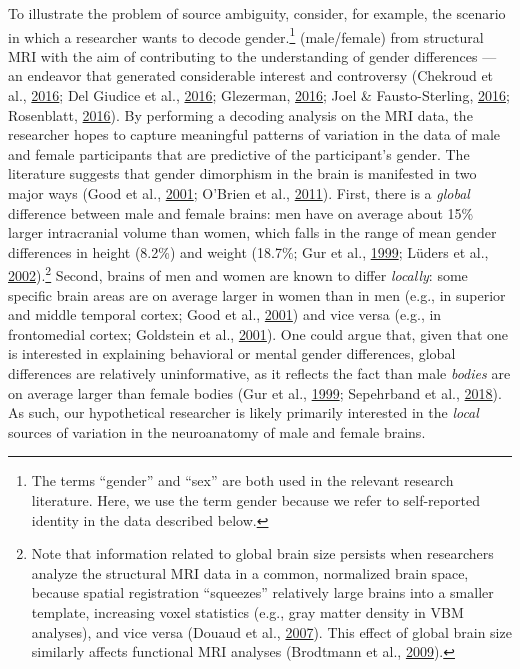 \documentclass[12pt,american,a4paper,oneside,]{memoir} %
\let\rmarkdownfootnote\footnote%
\def\footnote{\protect\rmarkdownfootnote}
\begin{document}
To illustrate the problem of source ambiguity, consider, for example, the scenario in which a researcher wants to decode gender.\footnote{The terms ``gender'' and ``sex'' are both used in the relevant research literature. Here, we use the term gender because we refer to self-reported identity in the data described below.} (male/female) from structural MRI with the aim of contributing to the understanding of gender differences --- an endeavor that generated considerable interest and controversy (Chekroud et al., \protect\hyperlink{ref-Chekroud2016-tc}{2016}; Del Giudice et al., \protect\hyperlink{ref-Del_Giudice2016-ns}{2016}; Glezerman, \protect\hyperlink{ref-Glezerman2016-xl}{2016}; Joel \& Fausto-Sterling, \protect\hyperlink{ref-Joel2016-uo}{2016}; Rosenblatt, \protect\hyperlink{ref-Rosenblatt2016-oy}{2016}). By performing a decoding analysis on the MRI data, the researcher hopes to capture meaningful patterns of variation in the data of male and female participants that are predictive of the participant's gender. The literature suggests that gender dimorphism in the brain is manifested in two major ways (Good et al., \protect\hyperlink{ref-Good2001-ak}{2001}; O'Brien et al., \protect\hyperlink{ref-OBrien2011-lj}{2011}). First, there is a \emph{global} difference between male and female brains: men have on average about 15\% larger intracranial volume than women, which falls in the range of mean gender differences in height (8.2\%) and weight (18.7\%; Gur et al., \protect\hyperlink{ref-Gur1999-qj}{1999}; Lüders et al., \protect\hyperlink{ref-Luders2002-ms}{2002}).\footnote{Note that information related to global brain size persists when researchers analyze the structural MRI data in a common, normalized brain space, because spatial registration ``squeezes'' relatively large brains into a smaller template, increasing voxel statistics (e.g., gray matter density in VBM analyses), and vice versa (Douaud et al., \protect\hyperlink{ref-Douaud2007-sw}{2007}). This effect of global brain size similarly affects functional MRI analyses (Brodtmann et al., \protect\hyperlink{ref-brodtmann2009regional}{2009}).} Second, brains of men and women are known to differ \emph{locally}: some specific brain areas are on average larger in women than in men (e.g., in superior and middle temporal cortex; Good et al., \protect\hyperlink{ref-Good2001-ak}{2001}) and vice versa (e.g., in frontomedial cortex; Goldstein et al., \protect\hyperlink{ref-Goldstein2001-dy}{2001}). One could argue that, given that one is interested in explaining behavioral or mental gender differences, global differences are relatively uninformative, as it reflects the fact than male \emph{bodies} are on average larger than female bodies (Gur et al., \protect\hyperlink{ref-Gur1999-qj}{1999}; Sepehrband et al., \protect\hyperlink{ref-Sepehrband2018-dy}{2018}). As such, our hypothetical researcher is likely primarily interested in the \emph{local} sources of variation in the neuroanatomy of male and female brains.
\end{document}
